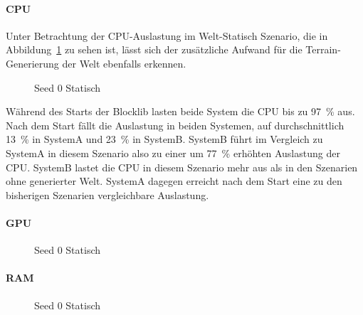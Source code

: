 \paragraph{CPU}
Unter Betrachtung der CPU-Auslastung im Welt-Statisch Szenario, die in Abbildung~\ref{fig:seed-0-static-cpu} zu sehen ist, lässt sich der zusätzliche Aufwand für die Terrain-Generierung der Welt ebenfalls erkennen.
\begin{figure}[!htbp]
	\caption{Seed 0 Statisch}\label{fig:seed-0-static-cpu}
\end{figure}
Während des Starts der Blocklib lasten beide System die CPU bis zu \SI{97}{\percent} aus. Nach dem Start fällt die Auslastung in beiden Systemen, auf durchschnittlich \SI{13}{\percent} in SystemA und \SI{23}{\percent} in SystemB.
SystemB führt im Vergleich zu SystemA in diesem Szenario also zu einer um \SI{77}{\percent} erhöhten Auslastung der CPU. SystemB lastet die CPU in diesem Szenario mehr aus als in den Szenarien ohne generierter Welt. SystemA dagegen erreicht nach dem Start eine zu den bisherigen Szenarien vergleichbare Auslastung.

\paragraph{GPU}
\begin{figure}[!htbp]
	\caption{Seed 0 Statisch}\label{fig:seed-0-static-gpu}
\end{figure}

\paragraph{RAM}
\begin{figure}[!htbp]
	\caption{Seed 0 Statisch}\label{fig:seed-0-static-mem}
\end{figure} 
